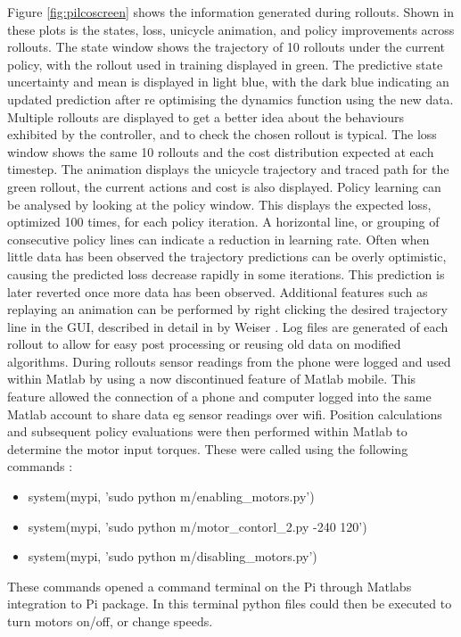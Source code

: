 \documentclass[twoside,twocolumn,12pt]{article}
\begin{document}
Figure \ref{fig:pilcoscreen} shows the information generated during rollouts. Shown in these plots is the states, loss, unicycle animation, and policy improvements across rollouts. The state window shows the trajectory of 10 rollouts under the current policy, with the rollout used in training displayed in green. The predictive state uncertainty and mean is displayed in light blue, with the dark blue indicating an updated prediction after re optimising the dynamics function using the new data. Multiple rollouts are displayed to get a better idea about the behaviours exhibited by the controller, and to check the chosen rollout is typical. The loss window shows the same 10 rollouts and the cost distribution expected at each timestep. The animation displays the unicycle trajectory and traced path for the green rollout, the current actions and cost is also displayed. Policy learning can be analysed by looking at the policy window. This displays the expected loss, optimized 100 times, for each policy iteration. A horizontal line, or grouping of consecutive policy lines can indicate a reduction in learning rate. Often when little data has been observed the trajectory predictions can be overly optimistic, causing the predicted loss decrease rapidly in some iterations. This prediction is later reverted once more data has been observed.   Additional features such as replaying an animation can be performed by right clicking the desired trajectory line in the GUI, described in detail in by Weiser \cite{eric}. 
Log files are generated of each rollout to allow for easy post processing or reusing old data on modified algorithms.
\newline
During rollouts sensor readings from the phone were logged and used within Matlab by using a now discontinued feature of Matlab mobile. This feature allowed the connection of a phone and computer logged into the same Matlab account to share data eg sensor readings over wifi.
\newline
Position calculations and subsequent policy evaluations were then performed within Matlab to determine the motor input torques. These were called using the following commands \cite{arsalan}: 
\begin{itemize}
\item system(mypi, 'sudo python m/enabling\_motors.py')
\item system(mypi, 'sudo python m/motor\_contorl\_2.py -240 120')
\item system(mypi, 'sudo python m/disabling\_motors.py')
\end{itemize}
These commands opened a command terminal on the Pi through Matlabs integration to Pi package. In this terminal python files could then be executed to turn motors on/off, or change speeds.
\end{document}
